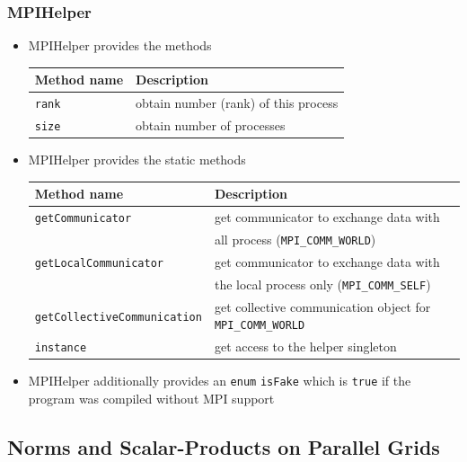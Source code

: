\documentclass[aspectratio=169,11pt]{beamer}
\theoremstyle{definition}
\begin{document}
\begin{frame}[fragile]
  \frametitle<presentation>{MPIHelper}
  \begin{itemize}
  \item MPIHelper provides the methods\medskip

    \begin{tabular}{l|l}
      \hline
      Method name & Description\\\hline
      \lstinline!rank! & obtain number (rank) of this process\\
      \lstinline!size! & obtain number of processes \\
      \hline
    \end{tabular}\medskip
  \item MPIHelper provides the static methods\medskip

    \begin{tabular}{l|p{6cm}}
      \hline
      Method name & Description\\\hline
      \lstinline!getCommunicator! & get communicator to exchange data
      with\\ & all process (\lstinline!MPI_COMM_WORLD!)\\
      \lstinline!getLocalCommunicator! & get communicator to exchange data with\\& the local process only (\lstinline!MPI_COMM_SELF!)\\
      \lstinline!getCollectiveCommunication! & get collective communication object for \lstinline!MPI_COMM_WORLD!\\
      \lstinline!instance! & get access to the helper singleton\\
      \hline
    \end{tabular} \medskip
   \item MPIHelper additionally provides an \lstinline!enum! \lstinline!isFake! which is \lstinline!true! if the program was compiled
without MPI support
 \end{itemize}
\end{frame}

\subsection{Norms and Scalar-Products on Parallel Grids}
\end{document}
